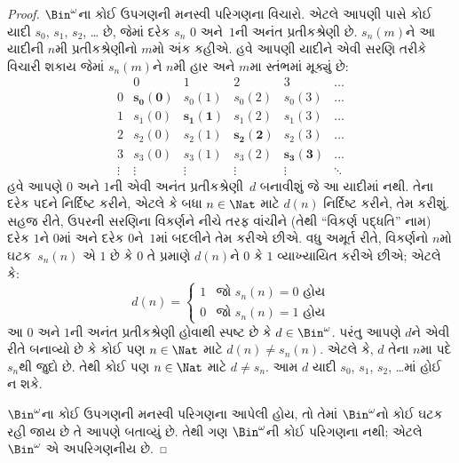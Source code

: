 \begin{proof}
$\Bin^\omega$ના કોઈ ઉપગણની મનસ્વી પરિગણના વિચારો. એટલે આપણી પાસે
કોઈ યાદી $s_{0}$, $s_{1}$, $s_{2}$, \dots{} છે, જેમાં દરેક $s_n$
$0$ અને~$1$ની અનંત પ્રતીકશ્રેણી છે. $s_n(m)$ને આ યાદીની $n$મી
પ્રતીકશ્રેણીનો $m$મો અંક કહીએ. હવે આપણી યાદીને એવી સરણિ તરીકે
વિચારી શકાય જેમાં $s_n(m)$ને $n$મી હાર અને $m$મા સ્તંભમાં મૂક્યું છે:
\[
\begin{array}{c|c|c|c|c|c}
& 0 & 1 & 2 & 3 & \dots \\\hline
0 & \mathbf{s_{0}(0)} & s_{0}(1) & s_{0}(2) & s_0(3) & \dots \\\hline
1 & s_{1}(0)& \mathbf{s_{1}(1)} & s_1(2) & s_1(3) & \dots \\\hline
2 & s_{2}(0)& s_{2}(1) & \mathbf{s_2(2)} & s_2(3) & \dots \\\hline
3 & s_{3}(0)& s_{3}(1) & s_3(2) & \mathbf{s_3(3)} & \dots \\\hline
\vdots & \vdots & \vdots & \vdots & \vdots & \mathbf{\ddots}
\end{array}
\]
હવે આપણે $0$ અને $1$ની એવી અનંત પ્રતીકશ્રેણી~$d$ બનાવીશું જે આ
યાદીમાં નથી. તેના દરેક પદને નિર્દિષ્ટ કરીને, એટલે કે બધા
$n \in \Nat$ માટે $d(n)$ નિર્દિષ્ટ કરીને, તેમ કરીશું. સહજ રીતે,
ઉપરની સરણિના વિકર્ણને નીચે તરફ વાંચીને (તેથી “વિકર્ણ પદ્ધતિ” નામ)
દરેક $1$ને $0$માં અને દરેક $0$ને~$1$માં બદલીને તેમ કરીએ છીએ.
વધુ અમૂર્ત રીતે, વિકર્ણનો $n$મો ઘટક~$s_n(n)$ એ $1$ છે કે
$0$ તે પ્રમાણે $d(n)$ને $0$ કે $1$ વ્યાખ્યાયિત કરીએ છીએ; એટલે કે:
\[
d(n) =
\begin{cases}
1 & \text{જો $s_{n}(n) = 0$ હોય}\\
0 & \text{જો $s_{n}(n) = 1$ હોય}
\end{cases}
\]
આ $0$ અને $1$ની અનંત પ્રતીકશ્રેણી હોવાથી સ્પષ્ટ છે કે
$d \in \Bin^\omega$. પરંતુ આપણે $d$ને એવી રીતે બનાવ્યો છે કે
કોઈ પણ $n \in \Nat$ માટે $d(n) \neq s_n(n)$. એટલે કે, $d$ તેના
$n$મા પદે $s_n$થી જુદો છે. તેથી કોઈ પણ $n\in \Nat$ માટે
$d \neq s_n$. આમ $d$ યાદી $s_0$, $s_1$, $s_2$, \dots{}માં હોઈ ન શકે.

$\Bin^\omega$ના કોઈ ઉપગણની મનસ્વી પરિગણના આપેલી હોય, તો તેમાં
$\Bin^\omega$નો કોઈ ઘટક રહી જાય છે તે આપણે બતાવ્યું છે.
તેથી ગણ $\Bin^\omega$ની કોઈ પરિગણના નથી; એટલે $\Bin^\omega$ એ
અપરિગણનીય છે.
\end{proof}

